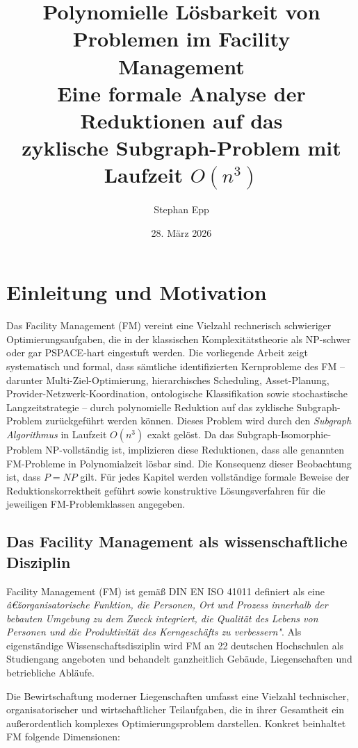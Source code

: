 ﻿\documentclass[a4paper,12pt]{article}
\title{\textbf{Polynomielle L\"osbarkeit von\\
Problemen im Facility Management}\\[0.5em]
\large Eine formale Analyse der Reduktionen auf das\\
zyklische Subgraph-Problem mit Laufzeit $O(n^3)$}
\author{Stephan Epp}
\date{28. M\"arz 2026}
\theoremstyle{definition}
\begin{document}
\maketitle
\tableofcontents
\newpage

\section{Einleitung und Motivation}
Das Facility Management (FM) vereint eine Vielzahl rechnerisch schwieriger Optimierungsaufgaben,
die in der klassischen Komplexitätstheorie als NP-schwer oder gar PSPACE-hart eingestuft werden.
Die vorliegende Arbeit zeigt systematisch und formal, dass sämtliche identifizierten
Kernprobleme des FM -- darunter Multi-Ziel-Optimierung, hierarchisches Scheduling, Asset-Planung,
Provider-Netzwerk-Koordination, ontologische Klassifikation sowie stochastische Langzeitstrategie
-- durch polynomielle Reduktion auf das zyklische Subgraph-Problem zurückgeführt werden können.
Dieses Problem wird durch den \emph{Subgraph Algorithmus} in Laufzeit $O(n^3)$ exakt gelöst.
Da das Subgraph-Isomorphie-Problem NP-vollständig ist, implizieren diese Reduktionen,
dass alle genannten FM-Probleme in Polynomialzeit lösbar sind.
Die Konsequenz dieser Beobachtung ist, dass $P = NP$ gilt.
Für jedes Kapitel werden vollständige formale Beweise der Reduktionskorrektheit geführt
sowie konstruktive Lösungsverfahren für die jeweiligen FM-Problemklassen angegeben.

\subsection{Das Facility Management als wissenschaftliche Disziplin}

Facility Management (FM) ist gemäß DIN EN ISO 41011 definiert als eine
\emph{â€žorganisatorische Funktion, die Personen, Ort und Prozess innerhalb der bebauten
Umgebung zu dem Zweck integriert, die Qualität des Lebens von Personen und die
Produktivität des Kerngeschäfts zu verbessern"}.
Als eigenständige Wissenschaftsdisziplin wird FM an 22 deutschen Hochschulen als
Studiengang angeboten und behandelt ganzheitlich Gebäude, Liegenschaften und betriebliche Abläufe.

Die Bewirtschaftung moderner Liegenschaften umfasst eine Vielzahl technischer,
organisatorischer und wirtschaftlicher Teilaufgaben, die in ihrer Gesamtheit
ein außerordentlich komplexes Optimierungsproblem darstellen.
Konkret beinhaltet FM folgende Dimensionen:
\end{document}
